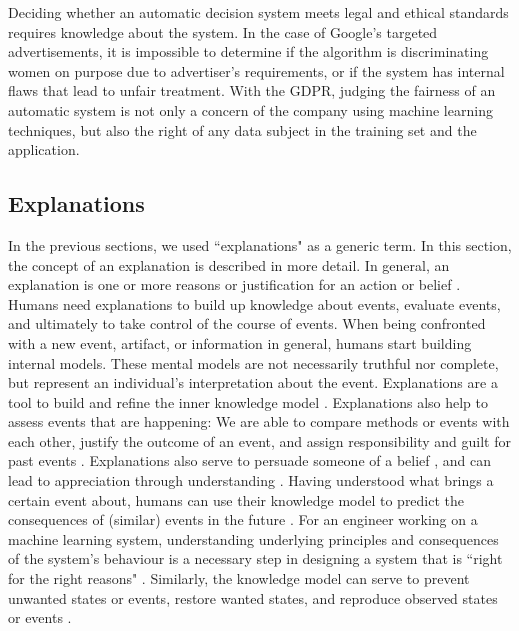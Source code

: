 Deciding whether an automatic decision system meets legal and ethical standards requires knowledge about the system. In the case of Google's targeted advertisements, it is impossible to determine if the algorithm is discriminating women on purpose due to advertiser's requirements, or if the system has internal flaws that lead to unfair treatment. With the GDPR, judging the fairness of an automatic system is not only a concern of the company using machine learning techniques, but also the right of any data subject in the training set and the application. 



\subsection{Explanations}
\label{subsec:explanations}
In the previous sections, we used ``explanations" as a generic term. In this section, the concept of an explanation is described in more detail.\newline
In general, an explanation is one or more reasons or justification for an action or belief \cite{preece2018asking}. Humans need explanations to build up knowledge about events, evaluate events, and ultimately to take control of the course of events.\newline
When being confronted with a new event, artifact, or information in general, humans start building internal models. These mental models are not necessarily truthful nor complete, but represent an individual's interpretation about the event. Explanations are a tool to build and refine the inner knowledge model \cite{miller2017explanation}.\newline
Explanations also help to assess events that are happening: We are able to compare methods or events with each other, justify the outcome of an event, and assign responsibility and guilt for past events \cite{keil2006explanation, miller2017explanation}. Explanations also serve to persuade someone of a belief \cite{miller2017explanation}, and can lead to appreciation through understanding \cite{keil2006explanation}.\newline
Having understood what brings a certain event about, humans can use their knowledge model to predict the consequences of (similar) events in the future \cite{miller2017explanation}. For an engineer working on a machine learning system, understanding underlying principles and consequences of the system's behaviour is a necessary step in designing a system that is ``right for the right reasons" \cite{preece2018asking}. Similarly, the knowledge model can serve to prevent unwanted states or events, restore wanted states, and reproduce observed states or events \cite{keil2006explanation}.


